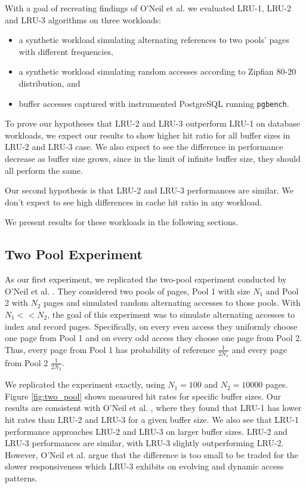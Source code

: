 With a goal of recreating findings of O'Neil et al. \cite{lruk} we evaluated LRU-1, LRU-2 and LRU-3 algorithms on three workloads:
\begin{itemize}
\item a synthetic workload simulating alternating references to two pools' pages with different frequencies,
\item a synthetic workload simulating random accesses according to Zipfian 80-20 distribution, and
\item buffer accesses captured with instrumented PostgreSQL running \texttt{pgbench}.
\end{itemize}

To prove our hypotheses that LRU-2 and LRU-3 outperform LRU-1 on database workloads, we expect our results to show higher hit ratio for all buffer sizes in LRU-2 and LRU-3 case. We also expect to see the difference in performance decrease as buffer size grows, since in the limit of infinite buffer size, they should all perform the same.

Our second hypothesis is that LRU-2 and LRU-3 performances are similar. We don't expect to see high differences in cache hit ratio in any workload.

We present results for these workloads in the following sections.

\subsection{Two Pool Experiment}

As our first experiment, we replicated the two-pool experiment conducted by O'Neil et al. \cite{lruk}. They considered two pools of pages, Pool 1 with size $N_1$ and Pool 2 with $N_2$ pages and simulated random alternating accesses to those pools. With $N_1 << N_2$, the goal of this experiment was to simulate alternating accesses to index and record pages. Specifically, on every even access they uniformly choose one page from Pool 1 and on every odd access they choose one page from Pool 2. Thus, every page from Pool 1 has probability of reference $\frac{1}{2N_1}$ and every page from Pool 2 $\frac{1}{2N_2}$.

We replicated the experiment exactly, using $N_1 = 100$ and $N_2 = 10000$ pages. Figure \ref{fig:two_pool} shows measured hit rates for specific buffer sizes. Our results are consistent with O'Neil et al. \cite{lruk}, where they found that LRU-1 has lower hit rates than LRU-2 and LRU-3 for a given buffer size. We also see that LRU-1 performance approaches LRU-2 and LRU-3 on larger buffer sizes. LRU-2 and LRU-3 performances are similar, with LRU-3 slightly outperforming LRU-2. However, O'Neil et al. argue that the difference is too small to be traded for the slower responsiveness which LRU-3 exhibits on evolving and dynamic access patterns.


